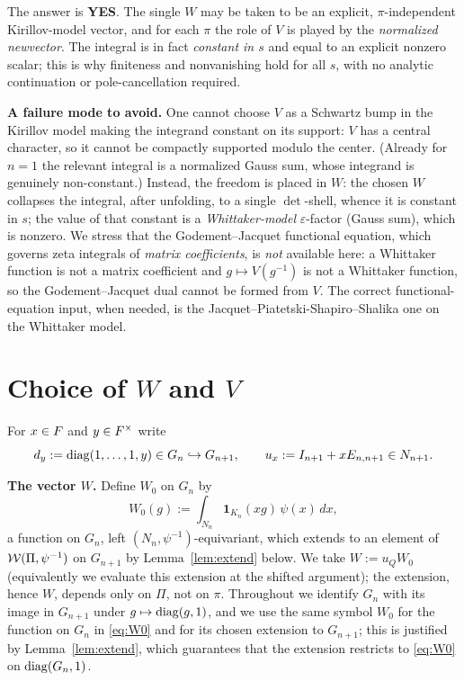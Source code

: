 \medskip
\noindent The answer is \textbf{YES}. The single $W$ may be taken to be an
explicit, $\pi$-independent Kirillov-model vector, and for each $\pi$
the role of $V$ is played by the \emph{normalized newvector}. The integral is in
fact \emph{constant in $s$} and equal to an explicit nonzero scalar; this is why
finiteness and nonvanishing hold for all $s$, with no analytic continuation or
pole-cancellation required.

\medskip
\noindent\textbf{A failure mode to avoid.} One cannot choose $V$ as a
Schwartz bump in the Kirillov model making the integrand constant on its
support: $V$ has a central character, so it cannot be compactly supported modulo
the center. (Already for $n=1$ the relevant integral is a normalized Gauss sum,
whose integrand is genuinely non-constant.) Instead, the freedom is placed in
$W$: the chosen $W$ collapses the integral, after unfolding, to a single
$\det$-shell, whence it is constant in $s$; the value of that constant is a
\emph{Whittaker-model} $\varepsilon$-factor \textup{(}Gauss sum\textup{)}, which
is nonzero. We stress that the Godement--Jacquet functional equation, which
governs zeta integrals of \emph{matrix coefficients}, is \emph{not} available
here: a Whittaker function is not a matrix coefficient and $g\mapsto V(g^{-1})$
is not a Whittaker function, so the Godement--Jacquet dual cannot be formed from
$V$. The correct functional-equation input, when needed, is the
Jacquet--Piatetski-Shapiro--Shalika one on the Whittaker model.

\section*{Choice of $W$ and $V$}

For $x\in F$ and $y\in F^\times$ write
\[
d_y:=\operatorname{diag}(1,\dots,1,y)\in G_n\hookrightarrow G_{n+1},\qquad
u_x:=I_{n+1}+xE_{n,n+1}\in N_{n+1}.
\]

\noindent\textbf{The vector $W$.} Define $W_0$ on $G_n$ by
\begin{equation}\label{eq:W0}
W_0(g):=\int_{N_n}\mathbf 1_{K_n}(xg)\,\psi(x)\,dx,
\end{equation}
a function on $G_n$, left $(N_n,\psi^{-1})$-equivariant, which extends to an element of
$\mathcal{W}(\Pi,\psi^{-1})$ on $G_{n+1}$ by Lemma~\ref{lem:extend} below. We take
$W:=u_Q W_0$ (equivalently we evaluate this extension at the shifted argument); the
extension, hence $W$, depends only on $\Pi$, not on $\pi$. Throughout we identify $G_n$
with its image in $G_{n+1}$ under $g\mapsto\operatorname{diag}(g,1)$, and we use the same symbol
$W_0$ for the function on $G_n$ in \eqref{eq:W0} and for its chosen extension to
$G_{n+1}$; this is justified by Lemma~\ref{lem:extend}, which guarantees that the
extension restricts to \eqref{eq:W0} on $\operatorname{diag}(G_n,1)$.

